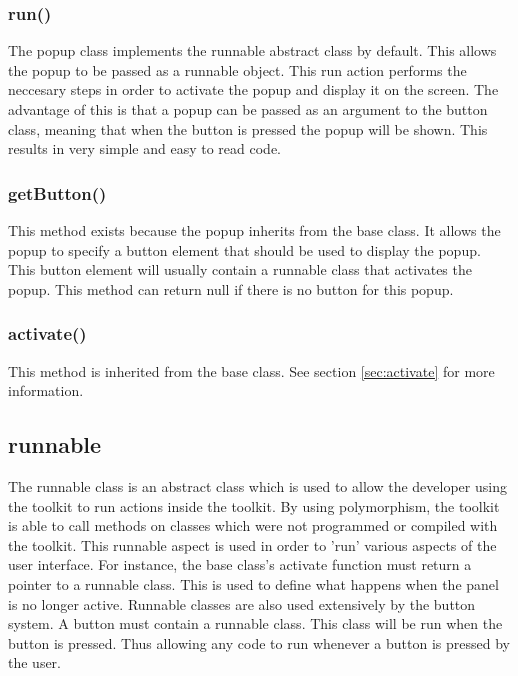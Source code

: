 \subsubsection{run()}

The popup class implements the runnable abstract class by default. This allows the popup to be passed as a runnable object. This run action performs the neccesary steps in order to activate the popup and display it on the screen. The advantage of this is that a popup can be passed as an argument to the button class, meaning that when the button is pressed the popup will be shown. This results in very simple and easy to read code.

\subsubsection{getButton()}

This method exists because the popup inherits from the base class. It allows the popup to specify a button element that should be used to display the popup. This button element will usually contain a runnable class that activates the popup. This method can return null if there is no button for this popup.

\subsubsection{activate()}

This method is inherited from the base class. See section \ref{sec:activate} for more information.


\subsection{runnable}
\label{sec:runnable}

The runnable class is an abstract class which is used to allow the developer using the toolkit to run actions inside the toolkit. By using polymorphism, the toolkit is able to call methods on classes which were not programmed or compiled with the toolkit. This runnable aspect is used in order to 'run' various aspects of the user interface. For instance, the base class's activate function must return a pointer to a runnable class. This is used to define what happens when the panel is no longer active. Runnable classes are also used extensively by the button system. A button must contain a runnable class. This class will be run when the button is pressed. Thus allowing any code to run whenever a button is pressed by the user. 

